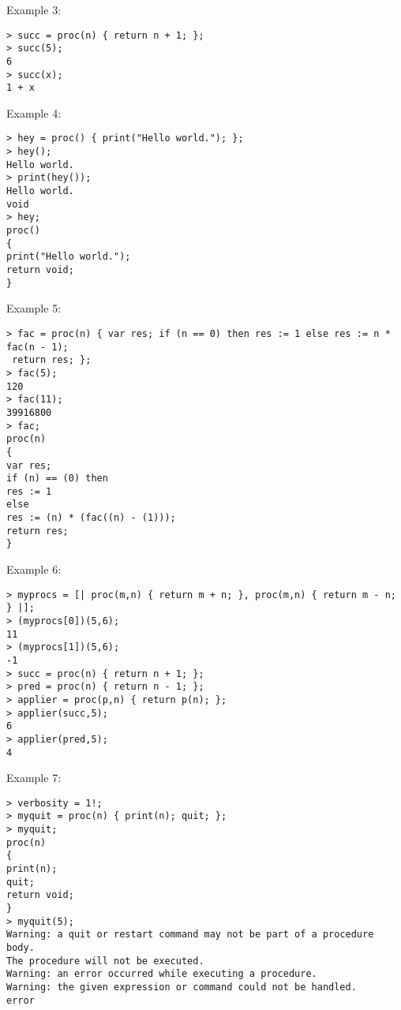\noindent Example 3: 
\begin{center}\begin{minipage}{15cm}\begin{Verbatim}[frame=single]
> succ = proc(n) { return n + 1; };
> succ(5);
6
> succ(x);
1 + x
\end{Verbatim}
\end{minipage}\end{center}
\noindent Example 4: 
\begin{center}\begin{minipage}{15cm}\begin{Verbatim}[frame=single]
> hey = proc() { print("Hello world."); };
> hey();
Hello world.
> print(hey());
Hello world.
void
> hey;
proc()
{
print("Hello world.");
return void;
}
\end{Verbatim}
\end{minipage}\end{center}
\noindent Example 5: 
\begin{center}\begin{minipage}{15cm}\begin{Verbatim}[frame=single]
> fac = proc(n) { var res; if (n == 0) then res := 1 else res := n * fac(n - 1);
 return res; };
> fac(5);
120
> fac(11);
39916800
> fac;
proc(n)
{
var res;
if (n) == (0) then
res := 1
else
res := (n) * (fac((n) - (1)));
return res;
}
\end{Verbatim}
\end{minipage}\end{center}
\noindent Example 6: 
\begin{center}\begin{minipage}{15cm}\begin{Verbatim}[frame=single]
> myprocs = [| proc(m,n) { return m + n; }, proc(m,n) { return m - n; } |];
> (myprocs[0])(5,6);
11
> (myprocs[1])(5,6);
-1
> succ = proc(n) { return n + 1; };
> pred = proc(n) { return n - 1; };
> applier = proc(p,n) { return p(n); };
> applier(succ,5);
6
> applier(pred,5);
4
\end{Verbatim}
\end{minipage}\end{center}
\noindent Example 7: 
\begin{center}\begin{minipage}{15cm}\begin{Verbatim}[frame=single]
> verbosity = 1!;
> myquit = proc(n) { print(n); quit; };
> myquit;
proc(n)
{
print(n);
quit;
return void;
}
> myquit(5);
Warning: a quit or restart command may not be part of a procedure body.
The procedure will not be executed.
Warning: an error occurred while executing a procedure.
Warning: the given expression or command could not be handled.
error
\end{Verbatim}
\end{minipage}\end{center}
